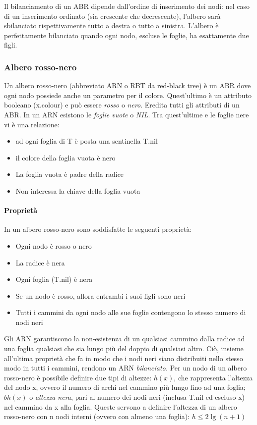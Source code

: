 \documentclass[
]{article}
\begin{document}
Il bilanciamento di un ABR dipende dall'ordine di inserimento dei nodi:
nel caso di un inserimento ordinato (sia crescente che decrescente),
l'albero sarà sbilanciato rispettivamente tutto a destra o tutto a
sinistra. L'albero è perfettamente bilanciato quando ogni nodo, escluse
le foglie, ha esattamente due figli.

\hypertarget{albero-rosso-nero}{%
\subsubsection{Albero rosso-nero}\label{albero-rosso-nero}}

Un albero rosso-nero (abbreviato ARN o RBT da red-black tree) è un ABR
dove ogni nodo possiede anche un parametro per il colore. Quest'ultimo è
un attributo booleano (x.colour) e può essere \emph{rosso} o
\emph{nero}. Eredita tutti gli attributi di un ABR. In un ARN esistono
le \emph{foglie vuote} o \emph{NIL}. Tra quest'ultime e le foglie nere
vi è una relazione:

\begin{itemize}
\item
  ad ogni foglia di T è posta una sentinella T.nil
\item
  il colore della foglia vuota è nero
\item
  La foglia vuota è padre della radice
\item
  Non interessa la chiave della foglia vuota~
\end{itemize}

\hypertarget{proprietuxe0}{%
\paragraph{Proprietà}\label{proprietuxe0}}

In un albero rosso-nero sono soddisfatte le seguenti proprietà:

\begin{itemize}
\item
  Ogni nodo è rosso o nero
\item
  La radice è nera
\item
  Ogni foglia (T.nil) è nera
\item
  Se un nodo è rosso, allora entrambi i suoi figli sono neri
\item
  Tutti i cammini da ogni nodo alle sue foglie contengono lo stesso
  numero di nodi neri
\end{itemize}

Gli ARN garantiscono la non-esistenza di un qualsiasi cammino dalla
radice ad una foglia qualsiasi che sia lungo più del doppio di qualsiasi
altro. Ciò, insieme all'ultima proprietà che fa in modo che i nodi neri
siano distribuiti nello stesso modo in tutti i cammini, rendono un ARN
\emph{bilanciato.} Per un nodo di un albero rosso-nero è possibile
definire due tipi di altezze: \(h(x)\), che rappresenta l'altezza del
nodo x, ovvero il numero di archi nel cammino più lungo fino ad una
foglia; \(bh(x)\) o \emph{altezza nera}, pari al numero dei nodi neri
(inclusa T.nil ed escluso x) nel cammino da x alla foglia. Queste
servono a definire l'altezza di un albero rosso-nero con n nodi interni
(ovvero con almeno una foglia): \(h \leq 2 \lg(n+1)\)
\end{document}
